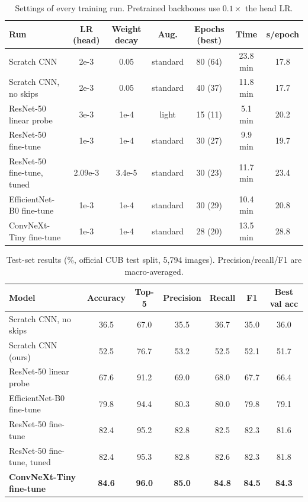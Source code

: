 \documentclass[11pt,a4paper]{article}
\begin{document}
\begin{table}[H]\centering\small
\begin{tabular}{lcccccc}
\toprule
Run & LR (head) & Weight decay & Aug. & Epochs (best) & Time & s/epoch\\
\midrule
Scratch CNN & 2e-3 & 0.05 & standard & 80 (64) & 23.8 min & 17.8\\
Scratch CNN, no skips & 2e-3 & 0.05 & standard & 40 (37) & 11.8 min & 17.7\\
ResNet-50 linear probe & 3e-3 & 1e-4 & light & 15 (11) & 5.1 min & 20.2\\
ResNet-50 fine-tune & 1e-3 & 1e-4 & standard & 30 (27) & 9.9 min & 19.7\\
ResNet-50 fine-tune, tuned & 2.09e-3 & 3.4e-5 & standard & 30 (23) & 11.7 min & 23.4\\
EfficientNet-B0 fine-tune & 1e-3 & 1e-4 & standard & 30 (29) & 10.4 min & 20.8\\
ConvNeXt-Tiny fine-tune & 1e-3 & 1e-4 & standard & 28 (20) & 13.5 min & 28.8\\
\bottomrule
\end{tabular}
\caption{Settings of every training run. Pretrained backbones use $0.1\times$ the head LR.}
\end{table}

\begin{table}[H]\centering\small
\begin{tabular}{lcccccc}
\toprule
Model & Accuracy & Top-5 & Precision & Recall & F1 & Best val acc\\
\midrule
Scratch CNN, no skips & 36.5 & 67.0 & 35.5 & 36.7 & 35.0 & 36.0\\
Scratch CNN (ours) & 52.5 & 76.7 & 53.2 & 52.5 & 52.1 & 51.7\\
ResNet-50 linear probe & 67.6 & 91.2 & 69.0 & 68.0 & 67.7 & 66.4\\
EfficientNet-B0 fine-tune & 79.8 & 94.4 & 80.3 & 80.0 & 79.8 & 79.1\\
ResNet-50 fine-tune & 82.4 & 95.2 & 82.8 & 82.5 & 82.3 & 81.6\\
ResNet-50 fine-tune, tuned & 82.4 & 95.3 & 82.8 & 82.6 & 82.3 & 81.8\\
\textbf{ConvNeXt-Tiny fine-tune} & \textbf{84.6} & \textbf{96.0} & \textbf{85.0} & \textbf{84.8} & \textbf{84.5} & \textbf{84.3}\\
\bottomrule
\end{tabular}
\caption{Test-set results (\%, official CUB test split, 5,794 images). Precision/recall/F1 are macro-averaged.}\label{tab:results}
\end{table}
\end{document}
